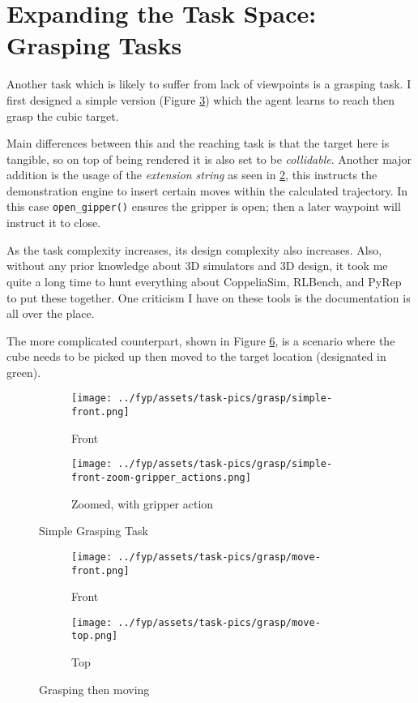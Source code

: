 \section{Expanding the Task Space: Grasping Tasks}
Another task which is likely to suffer from lack of viewpoints is a grasping task. I first designed
a simple version (Figure \ref{fig:grasp-simple}) which the agent learns to reach then grasp the cubic target. 

Main differences between this and the reaching task is that the target here is tangible, so on top of being rendered it is also set to be \emph{collidable}. Another major addition is the usage of the \emph{extension string} as seen in \ref{subfig:simple-zoom-actions}, this instructs the demonstration engine to insert certain moves within the calculated trajectory. In this case \verb|open_gipper()| ensures the gripper is open; then a later waypoint will instruct it to close. 

As the task complexity increases, its design complexity also increases. Also, without any prior knowledge about 3D simulators and 3D design, it took me quite a long time to hunt everything about CoppeliaSim, RLBench, and PyRep to put these together. One criticism I have on these tools is the documentation is all over the place. 

The more complicated counterpart, shown in Figure \ref{fig:grasp-move}, is a scenario where the cube needs to be picked up then moved to the target location (designated in green).

\begin{figure}[htpb] %
  \centering
  \begin{subfigure}{0.3\linewidth}
    \centering
    \texttt{[image: ../fyp/assets/task-pics/grasp/simple-front.png]}
    \caption{Front}\label{subfig:simple-front}
  \end{subfigure}
  \begin{subfigure}{0.5\linewidth}
    \centering
    \texttt{[image: ../fyp/assets/task-pics/grasp/simple-front-zoom-gripper\_actions.png]}
    \caption{Zoomed, with gripper action}\label{subfig:simple-zoom-actions}
  \end{subfigure}
  \caption{Simple Grasping Task}\label{fig:grasp-simple}
\end{figure}

\begin{figure}[htpb] %
  \centering
  \begin{subfigure}{0.45\linewidth}
    \centering
    \texttt{[image: ../fyp/assets/task-pics/grasp/move-front.png]} 
    \caption{Front}\label{subfig:grasp-move-front}
  \end{subfigure}
  \begin{subfigure}{0.45\linewidth}
    \centering
    \texttt{[image: ../fyp/assets/task-pics/grasp/move-top.png]}
    \caption{Top}\label{subfig:grasp-move-top}
  \end{subfigure}
  \caption{Grasping then moving}\label{fig:grasp-move}
\end{figure}


